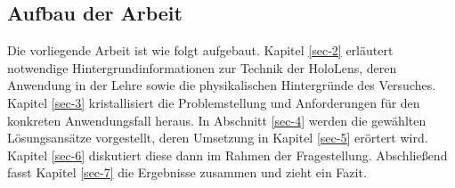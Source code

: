 \begin{comment}
\subsection{Aufgabenstellung}

Im Rahmen der Arbeit soll anhand der HoloLens untersucht werden, wie diese in der Physik-Lehre eingesetzt werden kann, um physikalische Inhalte zu vermitteln. Insbesondere soll betrachtet werden, wie physikalische Experimente mittels Mixed Reality Anwendungen durch zusätzliche Inhalte angereichert werden können.\\

\par
Dazu sind zunächst die technischen Möglichkeiten und Voraussetzungen der HoloLens zu betrachten und in Zusammenhang mit dem Anwendungsfall zu bringen. Weiterhin sind bestehende Ansätze im Einsatz von Mixed Reality Technologie in der Lehre, besonders in der Physik-Lehre, herauszuarbeiten und einzuordnen.

Davon ausgehend soll der Fragestellung anhand eines konkreten Beispiels nachgegangen werden. Für einen ausgewählten Versuchsaufbau sind die darzustellenden Objekte und Informationen sowie das Zusammenspiel dieser mit dem aufgebauten Experiment, der Umgebung und den Nutzern zu entwickeln. Für den ausgewählten Anwendungsfall soll eine Umsetzung mit der HoloLens konzipiert, designet und prototypisch implementiert werden.
\end{comment}

\subsection{Aufbau der Arbeit}
\label{sec-1-3}
Die vorliegende Arbeit ist wie folgt aufgebaut. Kapitel \ref{sec-2} erläutert notwendige Hintergrundinformationen zur Technik der HoloLens, deren Anwendung in der Lehre sowie die physikalischen Hintergründe des Versuches. Kapitel \ref{sec-3} kristallisiert die Problemstellung und Anforderungen für den konkreten Anwendungsfall heraus. In Abschnitt \ref{sec-4} werden die gewählten Lösungsansätze vorgestellt, deren Umsetzung in Kapitel \ref{sec-5} erörtert wird. Kapitel \ref{sec-6} diskutiert diese dann im Rahmen der Fragestellung. Abschließend fasst Kapitel \ref{sec-7} die Ergebnisse zusammen und zieht ein Fazit.